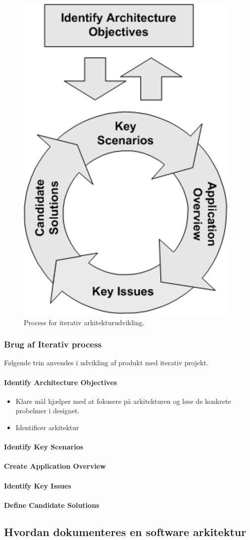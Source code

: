 \begin{figure}[h]
	\centering
	\includegraphics[width=0.5\linewidth]{figs/arc_ite}
	\caption{Process for iterativ arkitekturudvikling.}
	\label{fig:arc_ite}
\end{figure}

\subsubsection{Brug af Iterativ process}\label{sec:arc_ite}
Følgende trin anvendes i udvikling af produkt med iterativ projekt.

\paragraph{Identify Architecture Objectives}
\begin{itemize}
	\item Klare mål hjælper med at fokusere på arkitekturen og løse de konkrete probelmer i designet.
	\item Identificer arkitektur
\end{itemize}

\paragraph{Identify Key Scenarios}

\paragraph{Create Application Overview}

\paragraph{Identify Key Issues}

\paragraph{Define Candidate Solutions}

\subsection{Hvordan dokumenteres en software arkitektur}